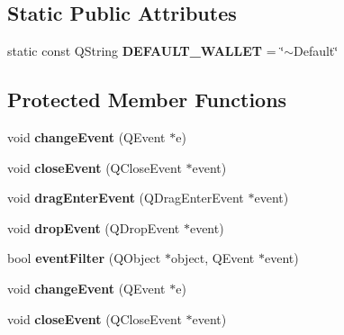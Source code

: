 \subsection*{Static Public Attributes}
\begin{DoxyCompactItemize}
\item 
\mbox{\label{class_bitcoin_g_u_i_a27b0db7e6c8dea8bc88c3bfff66f83d0}} 
static const Q\+String {\bfseries D\+E\+F\+A\+U\+L\+T\+\_\+\+W\+A\+L\+L\+ET} = \char`\"{}$\sim$Default\char`\"{}
\end{DoxyCompactItemize}
\subsection*{Protected Member Functions}
\begin{DoxyCompactItemize}
\item 
\mbox{\label{class_bitcoin_g_u_i_a11e94d1243e51b6398e7ca4079f7c46a}} 
void {\bfseries change\+Event} (Q\+Event $\ast$e)
\item 
\mbox{\label{class_bitcoin_g_u_i_ac46f8826c13b6340f5568d3f31fc3dfa}} 
void {\bfseries close\+Event} (Q\+Close\+Event $\ast$event)
\item 
\mbox{\label{class_bitcoin_g_u_i_a8c241174b5b109c2b27019bad289e34d}} 
void {\bfseries drag\+Enter\+Event} (Q\+Drag\+Enter\+Event $\ast$event)
\item 
\mbox{\label{class_bitcoin_g_u_i_a1faa00034444ca5930f0751b86646b68}} 
void {\bfseries drop\+Event} (Q\+Drop\+Event $\ast$event)
\item 
\mbox{\label{class_bitcoin_g_u_i_aeee2453bf1a3fb39bb22757e21f676d4}} 
bool {\bfseries event\+Filter} (Q\+Object $\ast$object, Q\+Event $\ast$event)
\item 
\mbox{\label{class_bitcoin_g_u_i_a11e94d1243e51b6398e7ca4079f7c46a}} 
void {\bfseries change\+Event} (Q\+Event $\ast$e)
\item 
\mbox{\label{class_bitcoin_g_u_i_ac46f8826c13b6340f5568d3f31fc3dfa}} 
void {\bfseries close\+Event} (Q\+Close\+Event $\ast$event)

\end{DoxyCompactItemize}
